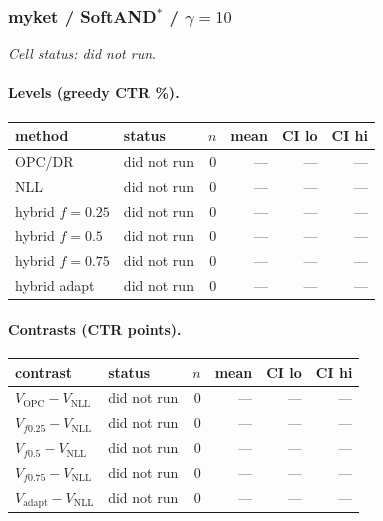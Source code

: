 \documentclass[10pt,a4paper]{article}
\begin{document}
\subsubsection{myket / SoftAND$^*$ / $\gamma=10$}
\emph{Cell status: did not run}.
\paragraph{Levels (greedy CTR \%).}
{\centering\small\begin{tabular}{llrrrr}
\toprule method & status & $n$ & mean & CI lo & CI hi \\
\midrule
OPC/DR & did not run & 0 & --- & --- & --- \\
NLL & did not run & 0 & --- & --- & --- \\
hybrid $f{=}0.25$ & did not run & 0 & --- & --- & --- \\
hybrid $f{=}0.5$ & did not run & 0 & --- & --- & --- \\
hybrid $f{=}0.75$ & did not run & 0 & --- & --- & --- \\
hybrid adapt & did not run & 0 & --- & --- & --- \\
\bottomrule\end{tabular}\par}
\paragraph{Contrasts (CTR points).}
{\centering\small\begin{tabular}{llrrrr}
\toprule contrast & status & $n$ & mean & CI lo & CI hi \\
\midrule
$V_{\mathrm{OPC}}-V_{\mathrm{NLL}}$ & did not run & 0 & --- & --- & --- \\
$V_{f0.25}-V_{\mathrm{NLL}}$ & did not run & 0 & --- & --- & --- \\
$V_{f0.5}-V_{\mathrm{NLL}}$ & did not run & 0 & --- & --- & --- \\
$V_{f0.75}-V_{\mathrm{NLL}}$ & did not run & 0 & --- & --- & --- \\
$V_{\mathrm{adapt}}-V_{\mathrm{NLL}}$ & did not run & 0 & --- & --- & --- \\
\bottomrule\end{tabular}\par}
\end{document}
